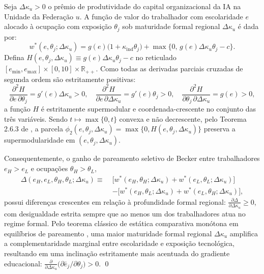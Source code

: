 Seja $\Delta\kappa_u > 0$ o prêmio de produtividade do capital organizacional da IA na Unidade da Federação $u$. A função de valor do trabalhador com escolaridade $e$ alocado à ocupação com exposição $\theta_j$ sob maturidade formal regional $\Delta\kappa_u$ é dada por:
\begin{equation}
    w^*(e, \theta_j; \Delta\kappa_u) = g(e)\big(1 + \kappa_{\text{ind}}\theta_j\big) + \max\big\{0, \, g(e)\Delta\kappa_u\theta_j - c\big\}.
\end{equation}
Defina $H(e, \theta_j, \Delta\kappa_u) \equiv g(e)\Delta\kappa_u\theta_j - c$ no reticulado $[e_{\min}, e_{\max}] \times [0, 10] \times \mathbb{R}_{++}$. Como todas as derivadas parciais cruzadas de segunda ordem são estritamente positivas:
\begin{equation}
    \frac{\partial^2 H}{\partial e \, \partial \theta_j} = g'(e)\Delta\kappa_u > 0,
    \quad \frac{\partial^2 H}{\partial e \, \partial \Delta\kappa_u} = g'(e)\theta_j > 0,
    \quad \frac{\partial^2 H}{\partial \theta_j \, \partial \Delta\kappa_u} = g(e) > 0,
\end{equation}
a função $H$ é estritamente supermodular e coordenada-crescente no conjunto das três variáveis. Sendo $t \mapsto \max\{0, t\}$ convexa e não decrescente, pelo Teorema 2.6.3 de \citet{topkis1998supermodularity}, a parcela $\phi_2(e, \theta_j, \Delta\kappa_u) = \max\{0, H(e, \theta_j, \Delta\kappa_u)\}$ preserva a supermodularidade em $(e, \theta_j, \Delta\kappa_u)$.

Consequentemente, o ganho de pareamento seletivo de Becker entre trabalhadores $e_H > e_L$ e ocupações $\theta_H > \theta_L$,
\begin{equation}
\begin{aligned}
    \Delta(e_H, e_L, \theta_H, \theta_L; \Delta\kappa_u) \equiv \;& \big[w^*(e_H, \theta_H; \Delta\kappa_u) + w^*(e_L, \theta_L; \Delta\kappa_u)\big] \\
    & - \big[w^*(e_H, \theta_L; \Delta\kappa_u) + w^*(e_L, \theta_H; \Delta\kappa_u)\big],
\end{aligned}
\end{equation}
possui diferenças crescentes em relação à profundidade formal regional: $\frac{\partial \Delta}{\partial \Delta\kappa_u} \ge 0$, com desigualdade estrita sempre que ao menos um dos trabalhadores atua no regime formal. Pelo teorema clássico de estática comparativa monótona em equilíbrios de pareamento \citep{becker1973theory,topkis1998supermodularity}, uma maior maturidade formal regional $\Delta\kappa_u$ amplifica a complementaridade marginal entre escolaridade e exposição tecnológica, resultando em uma inclinação estritamente mais acentuada do gradiente educacional: $\frac{\partial}{\partial \Delta\kappa_u}\big(\partial \bar{e}_j / \partial \theta_j\big) > 0$. \qed

